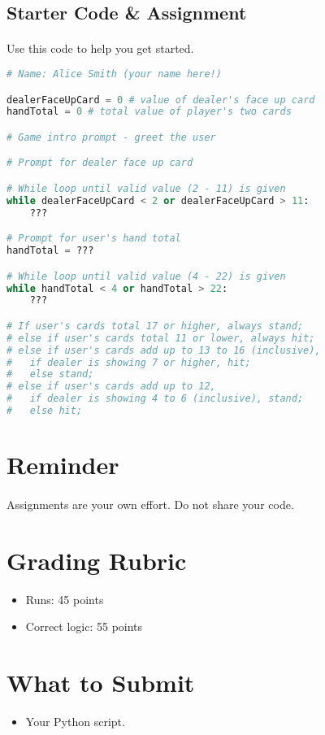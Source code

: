 \documentclass[letter,10pt]{article}
\begin{document}
    \subsection*{Starter Code \& Assignment}
    \paragraph{}Use this code to help you get started.
    \begin{lstlisting}[language=python]
# Name: Alice Smith (your name here!)

dealerFaceUpCard = 0 # value of dealer's face up card
handTotal = 0 # total value of player's two cards

# Game intro prompt - greet the user

# Prompt for dealer face up card

# While loop until valid value (2 - 11) is given
while dealerFaceUpCard < 2 or dealerFaceUpCard > 11:
    ???

# Prompt for user's hand total
handTotal = ???

# While loop until valid value (4 - 22) is given
while handTotal < 4 or handTotal > 22:
    ???

# If user's cards total 17 or higher, always stand;
# else if user's cards total 11 or lower, always hit;
# else if user's cards add up to 13 to 16 (inclusive),
#   if dealer is showing 7 or higher, hit;
#   else stand;
# else if user's cards add up to 12,
#   if dealer is showing 4 to 6 (inclusive), stand;
#   else hit;
    \end{lstlisting}

    \section*{Reminder}
    \paragraph{}Assignments are your own effort. Do not share your code.
    
    \section*{Grading Rubric}
    \begin{itemize}
        \item Runs: 45 points
        \item Correct logic: 55 points
    \end{itemize}
    
   \section*{What to Submit}
   \begin{itemize}
       \item Your Python script.
   \end{itemize}
\end{document}
